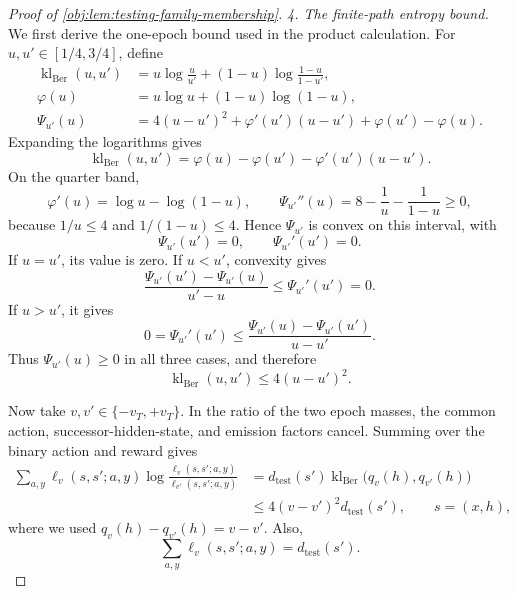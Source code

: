 \begin{proof}[Proof of \cref{obj:lem:testing-family-membership}]
\emph{4. The finite-path entropy bound.}
We first derive the one-epoch bound used in the product calculation. For
\(u,u'\in[1/4,3/4]\), define
\[
\begin{aligned}
\operatorname{kl}_{\mathrm{Ber}}(u,u')
&=u\log\frac{u}{u'}
 +(1-u)\log\frac{1-u}{1-u'},\\
\varphi(u)&=u\log u+(1-u)\log(1-u),\\
\Psi_{u'}(u)
&=4(u-u')^2+\varphi'(u')(u-u')
  +\varphi(u')-\varphi(u).
\end{aligned}
\]
Expanding the logarithms gives
\[
\operatorname{kl}_{\mathrm{Ber}}(u,u')
=\varphi(u)-\varphi(u')-\varphi'(u')(u-u').
\]
On the quarter band,
\[
\varphi'(u)=\log u-\log(1-u),
\qquad
\Psi_{u'}''(u)=8-\frac1u-\frac1{1-u}\geq0,
\]
because \(1/u\leq4\) and \(1/(1-u)\leq4\). Hence \(\Psi_{u'}\) is convex on this interval, with
\[
\Psi_{u'}(u')=0,\qquad \Psi_{u'}'(u')=0.
\]
If \(u=u'\), its value is zero. If \(u<u'\), convexity gives
\[
\frac{\Psi_{u'}(u')-\Psi_{u'}(u)}{u'-u}
\leq\Psi_{u'}'(u')=0.
\]
If \(u>u'\), it gives
\[
0=\Psi_{u'}'(u')
\leq\frac{\Psi_{u'}(u)-\Psi_{u'}(u')}{u-u'}.
\]
Thus \(\Psi_{u'}(u)\geq0\) in all three cases, and therefore
\[
\operatorname{kl}_{\mathrm{Ber}}(u,u')
\leq4(u-u')^2.
\]

Now take \(v,v'\in\{-v_T,+v_T\}\). In the ratio of the two epoch masses, the common action, successor-hidden-state, and emission factors cancel. Summing over the binary action and reward gives
\[
\begin{aligned}
\sum_{a,y}\ell_v(s,s';a,y)
 \log\frac{\ell_v(s,s';a,y)}{\ell_{v'}(s,s';a,y)}
&=d_{\mathrm{test}}(s')
  \operatorname{kl}_{\mathrm{Ber}}\bigl(q_v(h),q_{v'}(h)\bigr)\\
&\leq4(v-v')^2d_{\mathrm{test}}(s'),
\qquad s=(x,h),
\end{aligned}
\]
where we used \(q_v(h)-q_{v'}(h)=v-v'\). Also,
\[
\sum_{a,y}\ell_v(s,s';a,y)=d_{\mathrm{test}}(s').
\]


\end{proof}
